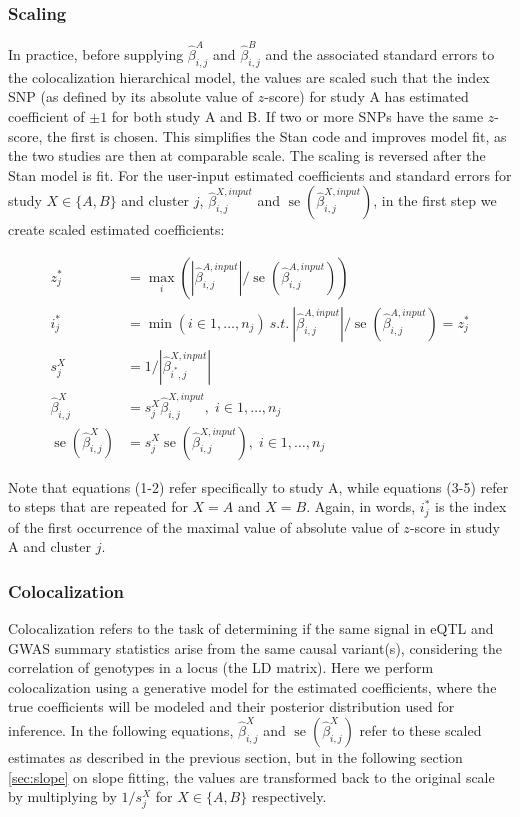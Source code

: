 \documentclass[11pt]{article}
\DeclareMathOperator{\se}{\textrm{se}}
\begin{document}
\subsubsection{Scaling}

In practice, before supplying
$\widehat{\beta}^A_{i,j}$ and $\widehat{\beta}^B_{i,j}$
and the associated standard errors to the colocalization hierarchical
model, the values are scaled such that the index SNP (as defined by
its absolute value of $z$-score) for study A has estimated coefficient
of $\pm 1$ for both study A and B. If two or more SNPs have the same
$z$-score, the first is chosen.  This simplifies the Stan code and
improves model fit, as the two studies are then at comparable
scale. The scaling is reversed after the Stan model is fit.  For the
user-input estimated coefficients and standard errors for
study $X \in \{A,B\}$ and cluster $j$,
$\widehat{\beta}^{X,input}_{i,j}$ and $\se(\widehat{\beta}^{X,input}_{i,j})$,
in the first step we create scaled estimated coefficients:

\begin{align}
  z^*_j &= \max_i \left( |\widehat{\beta}^{A,input}_{i,j}|/\se(\widehat{\beta}^{A,input}_{i,j}) \right) \\
  i^*_j &= \min \left(i \in 1,\dots,n_j \right) \  s.t. \  |\widehat{\beta}^{A,input}_{i,j}|/\se(\widehat{\beta}^{A,input}_{i,j}) = z^*_j \\
  s^X_j &= 1/|\widehat{\beta}^{X,input}_{i^*,j}| \\
  \widehat{\beta}^X_{i,j} &= s_j^X \widehat{\beta}^{X,input}_{i,j}, \; i \in 1,\dots,n_j \\
  \se(\widehat{\beta}^X_{i,j}) &= s_j^X \se(\widehat{\beta}^{X,input}_{i,j}), \; i \in 1,\dots,n_j
\end{align}

Note that equations (1-2) refer specifically to study A, while
equations (3-5) refer to steps that are repeated for $X=A$ and
$X=B$. Again, in words, $i^*_j$ is the index of the first occurrence of
the maximal value of absolute value of $z$-score in study A and cluster
$j$.

\subsubsection{Colocalization}

Colocalization refers to the task of determining if the same signal in
eQTL and GWAS summary statistics arise from the same causal variant(s),
considering the correlation of genotypes in a locus (the LD
matrix). Here we perform colocalization using a generative model for
the estimated coefficients, where the true coefficients will be
modeled and their posterior distribution used for inference.
In the following equations, $\widehat{\beta}^X_{i,j}$ and
$\se(\widehat{\beta}^X_{i,j})$ refer to these scaled estimates as
described in the previous section, but in the following section
\ref{sec:slope} on slope fitting, the values are transformed back to
the original scale by multiplying by $1/s^X_j$ for $X \in \{A,B\}$
respectively.
\end{document}
